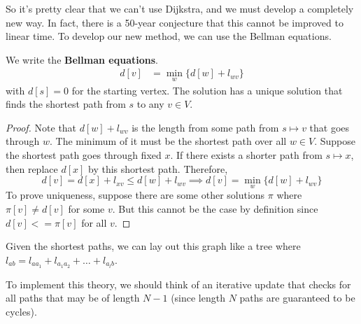   So it's pretty clear that we can't use Dijkstra, and we must develop a completely new way. In fact, there is a 50-year conjecture that this cannot be improved to linear time. To develop our new method, we can use the Bellman equations.

  \begin{theorem}
    We write the \textbf{Bellman equations}. 
    \begin{align}
      d[v] & = \min_{w} \{ d[w] + l_{w v}\}
    \end{align}
    with $d[s] = 0$ for the starting vertex. The solution has a unique solution that finds the shortest path from $s$ to any $v \in V$.    
  \end{theorem}
  \begin{proof}
    Note that $d[w] + l_{wv}$ is the length from some path from $s \mapsto v$ that goes through $w$. The minimum of it must be the shortest path over all $w \in V$. Suppose the shortest path goes through fixed $x$. If there exists a shorter path from $s \mapsto x$, then replace $d[x]$ by this shortest path. Therefore, 
    \begin{equation}
      d[v] = d[x] + l_{xv} \leq d[w] + l_{wv} \implies d[v] = \min_{w} \{d[w] + l_{w v}\}
    \end{equation}
    To prove uniqueness, suppose there are some other solutions $\pi$ where $\pi[v] \neq d[v]$ for some $v$. But this cannot be the case by definition since $d[v] <= \pi[v]$ for all $v$. 
  \end{proof}

  \begin{theorem}
    Given the shortest paths, we can lay out this graph like a tree where $l_{ab} = l_{a a_1} + l_{a_1 a_2} + \ldots + l_{a_l b}$. 
  \end{theorem}

  To implement this theory, we should think of an iterative update that checks for all paths that may be of length $N-1$ (since length $N$ paths are guaranteed to be cycles). 

